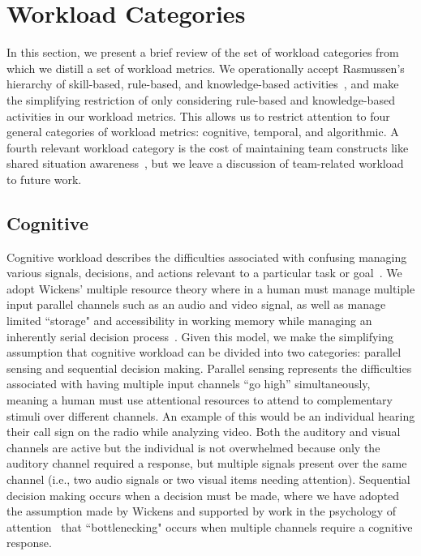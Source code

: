 \section{Workload Categories}

In this section, we present a brief review of the set of workload categories from which we distill a set of workload metrics.  We operationally accept Rasmussen's hierarchy of skill-based, rule-based, and knowledge-based activities~\cite{Rasmussen83}, and make the simplifying restriction of only considering rule-based and knowledge-based activities in our workload metrics.  This allows us to restrict attention to four general categories of workload metrics: cognitive, temporal, and algorithmic.  A fourth relevant workload category is the cost of maintaining team constructs like shared situation awareness~\cite{EliasFiore2011}, but we leave a discussion of team-related workload to future work.



\subsection{Cognitive}
Cognitive workload describes the difficulties associated with confusing managing various signals, decisions, and actions relevant to a particular task or goal~\cite{MorayEtAl91,lebiere2013cognitive,Goodrich2004,Chadwick2004}. We adopt Wickens' multiple resource theory where in a human must manage multiple input parallel channels such as an audio and video signal, as well as manage limited ``storage" and accessibility in working memory while managing an inherently serial decision process~\cite{wickens2002multiple}. Given this model, we make the simplifying assumption that cognitive workload can be divided into two categories: parallel sensing and sequential decision making. Parallel sensing represents the difficulties associated with having multiple input channels ``go high'' simultaneously, meaning a human must use attentional resources to attend to complementary stimuli over different channels. An example of this would be an individual hearing their call sign on the radio while analyzing video. Both the auditory and visual channels are active but the individual is not overwhelmed because only the auditory channel required a response, but multiple signals present over the same channel (i.e., two audio signals or two visual items needing attention). Sequential decision making occurs when a decision must be made, where we have adopted the assumption made by Wickens and supported by work in the psychology of attention~\cite{Pashler98} that ``bottlenecking" occurs when multiple channels require a cognitive response. 

